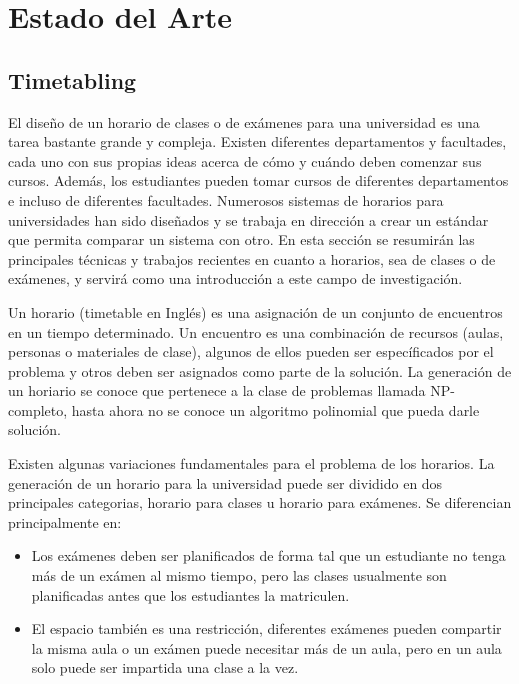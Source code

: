 \chapter{Estado del Arte}

\section{Timetabling}

El diseño de un horario de clases o de exámenes para una universidad es una tarea bastante grande y compleja.
Existen diferentes departamentos y facultades, cada uno con sus propias ideas acerca de cómo y cuándo deben
comenzar sus cursos. Además, los estudiantes pueden tomar cursos de diferentes departamentos e incluso de
diferentes facultades. Numerosos sistemas de horarios para universidades han sido diseñados y se trabaja
en dirección a crear un estándar que permita comparar un sistema con otro. En esta sección se resumirán
las principales técnicas y trabajos recientes en cuanto a horarios, sea de clases o de exámenes, y servirá
como una introducción a este campo de investigación.

Un horario (timetable en Inglés) es una asignación de un conjunto de encuentros en un tiempo determinado.
Un encuentro es una combinación de recursos (aulas, personas o materiales de clase), algunos de ellos pueden
ser específicados por el problema y otros deben ser asignados como parte de la solución. La generación de un
horiario se conoce que pertenece a la clase de problemas llamada NP-completo, hasta ahora no se conoce un
algoritmo polinomial que pueda darle solución.

Existen algunas variaciones fundamentales para el problema de los horarios. La generación de un horario para
la universidad puede ser dividido en dos principales categorias, horario para clases u horario para exámenes.
Se diferencian principalmente en:

\begin{itemize}
	\item Los exámenes deben ser planificados de forma tal que un estudiante no tenga más de un exámen al
		mismo tiempo, pero las clases usualmente son planificadas antes que los estudiantes la matriculen.
	\item El espacio también es una restricción, diferentes exámenes pueden compartir la misma aula o un exámen
		puede necesitar más de un aula, pero en un aula solo puede ser impartida una clase a la vez.
\end{itemize}

